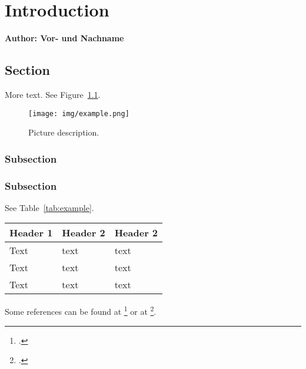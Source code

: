 \chapter{Introduction}

\textbf{Author: Vor- und Nachname}

\vspace{2mm}

\lipsum[1-3]

\section{Section}
More text. \lipsum[1] See Figure~\ref{pic:example}.

\begin{figure}[h]
	\centering
	\texttt{[image: img/example.png]}
	\caption{Picture description.}
	\label{pic:example}
\end{figure}

\subsection{Subsection}
\lipsum[1]

\subsection{Subsection}
\lipsum[1] See Table~\ref{tab:example}.

\begin{center}
	\begin{tabular}{| l | l | l |}
		\hline
		\bfseries Header 1 & \bfseries Header 2 & \bfseries Header 2 \\
		\hline
		Text & text & text \\
		\hline
		Text & text & text  \\
		\hline
		Text & text & text  \\
		\hline
	\end{tabular}
	\label{tab:example}
\end{center}



\lipsum[1] Some references can be found at \footcite{robo4you} or at  \footcite{Hope_Learning_TensorFlow}. 


\filbreak
